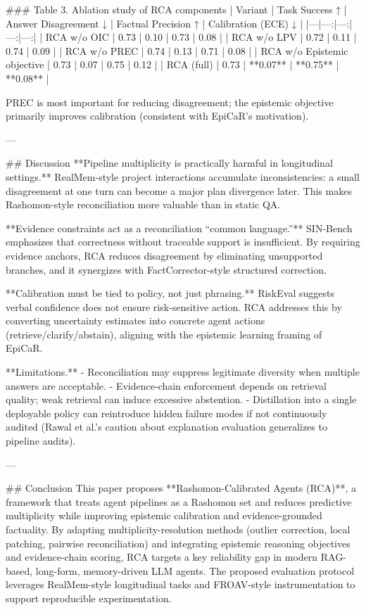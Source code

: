 ### Table 3. Ablation study of RCA components  
| Variant | Task Success ↑ | Answer Disagreement ↓ | Factual Precision ↑ | Calibration (ECE) ↓ |
|---|---:|---:|---:|---:|
| RCA w/o OIC | 0.73 | 0.10 | 0.73 | 0.08 |
| RCA w/o LPV | 0.72 | 0.11 | 0.74 | 0.09 |
| RCA w/o PREC | 0.74 | 0.13 | 0.71 | 0.08 |
| RCA w/o Epistemic objective | 0.73 | 0.07 | 0.75 | 0.12 |
| RCA (full) | 0.73 | **0.07** | **0.75** | **0.08** |

PREC is most important for reducing disagreement; the epistemic objective primarily improves calibration (consistent with EpiCaR’s motivation).

---

## Discussion  
**Pipeline multiplicity is practically harmful in longitudinal settings.** RealMem-style project interactions accumulate inconsistencies: a small disagreement at one turn can become a major plan divergence later. This makes Rashomon-style reconciliation more valuable than in static QA.

**Evidence constraints act as a reconciliation “common language.”** SIN-Bench emphasizes that correctness without traceable support is insufficient. By requiring evidence anchors, RCA reduces disagreement by eliminating unsupported branches, and it synergizes with FactCorrector-style structured correction.

**Calibration must be tied to policy, not just phrasing.** RiskEval suggests verbal confidence does not ensure risk-sensitive action. RCA addresses this by converting uncertainty estimates into concrete agent actions (retrieve/clarify/abstain), aligning with the epistemic learning framing of EpiCaR.

**Limitations.**  
- Reconciliation may suppress legitimate diversity when multiple answers are acceptable.  
- Evidence-chain enforcement depends on retrieval quality; weak retrieval can induce excessive abstention.  
- Distillation into a single deployable policy can reintroduce hidden failure modes if not continuously audited (Rawal et al.’s caution about explanation evaluation generalizes to pipeline audits).

---

## Conclusion  
This paper proposes **Rashomon-Calibrated Agents (RCA)**, a framework that treats agent pipelines as a Rashomon set and reduces predictive multiplicity while improving epistemic calibration and evidence-grounded factuality. By adapting multiplicity-resolution methods (outlier correction, local patching, pairwise reconciliation) and integrating epistemic reasoning objectives and evidence-chain scoring, RCA targets a key reliability gap in modern RAG-based, long-form, memory-driven LLM agents. The proposed evaluation protocol leverages RealMem-style longitudinal tasks and FROAV-style instrumentation to support reproducible experimentation.

